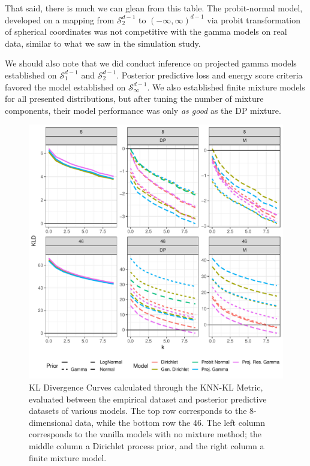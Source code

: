 That said, there is much we can glean from this table.  The probit-normal model, developed on a mapping
  from $\mathcal{S}_{2}^{d-1}$ to $(-\infty,\infty)^{d-1}$ via probit transformation of spherical coordinates
  was not competitive with the gamma models on real data, similar to what we saw in the simulation study.

We should also note that we did conduct inference on projected gamma models established on
  $\mathcal{S}_{1}^{d-1}$ and $\mathcal{S}_2^{d-1}$.  Posterior predictive loss and energy score criteria
  favored the model established on $\mathcal{S}_{\infty}^{d-1}$.  We also established finite mixture
  models for all presented distributions, but after tuning the number of mixture components, their
  model performance was only \emph{as good} as the DP mixture.

\begin{figure}[h]
  \centering
  \label{fig:knnkl}
  \includegraphics[width = 5in]{./images/kl_divergence_curves}
  \caption{KL Divergence Curves calculated through the KNN-KL Metric, evaluated between the empirical
  dataset and posterior predictive datasets of various models.  The top row corresponds to the
  8-dimensional data, while the bottom row the 46.  The left column corresponds to the vanilla models
  with no mixture method; the middle column a Dirichlet process prior, and the right column a finite
  mixture model.}
\end{figure}

